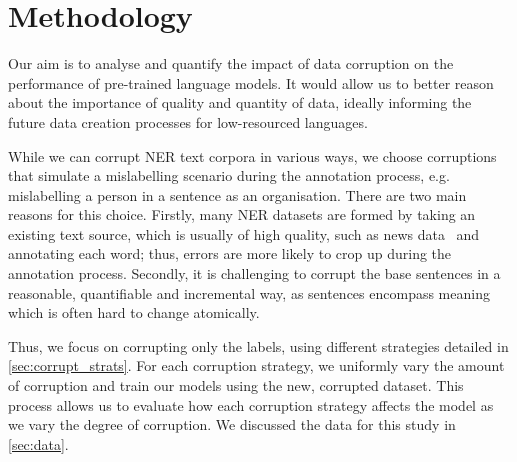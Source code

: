 \documentclass{article}
\begin{document}
\section{Methodology}
\label{sec:method}
Our aim is to analyse and quantify the impact of data corruption on the performance of pre-trained language models. It would allow us to better reason about the importance of quality and quantity of data, ideally informing the future data creation processes for low-resourced languages.

While we can corrupt NER text corpora in various ways, we choose corruptions that simulate a mislabelling scenario during the annotation process, e.g. mislabelling a person in a sentence as an organisation. There are two main reasons for this choice. Firstly, many NER datasets are formed by taking an existing text source, which is usually of high quality, such as news data~\citep{adelani2021MasakhaNER} and annotating each word; thus, errors are more likely to crop up during the annotation process. Secondly, it is challenging to corrupt the base sentences in a reasonable, quantifiable and incremental way, as sentences encompass meaning which is often hard to change atomically.

Thus, we focus on corrupting only the labels, using different strategies detailed in \autoref{sec:corrupt_strats}. For each corruption strategy, we uniformly vary the amount of corruption and train our models using the new, corrupted dataset. This process allows us to evaluate how each corruption strategy affects the model as we vary the degree of corruption. We discussed the data for this study in \autoref{sec:data}.
 
\end{document}
